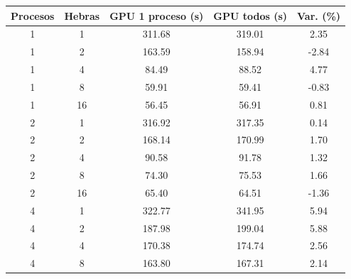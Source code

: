 \begin{table}[ht]
    \centering
    \scriptsize
    \setlength{\tabcolsep}{2pt}
    \renewcommand{\arraystretch}{1.1}
    \begin{tabular}{|c|c|c|c|c|}
        \hline
        \textbf{Procesos} & \textbf{Hebras} & \textbf{GPU 1 proceso (s)} & \textbf{GPU todos (s)} & \textbf{Var. (\%)} \\
        \hline
        1                 & 1               & 311.68                     & 319.01                 & 2.35               \\
        1                 & 2               & 163.59                     & 158.94                 & -2.84              \\
        1                 & 4               & 84.49                      & 88.52                  & 4.77               \\
        1                 & 8               & 59.91                      & 59.41                  & -0.83              \\
        1                 & 16              & 56.45                      & 56.91                  & 0.81               \\
        2                 & 1               & 316.92                     & 317.35                 & 0.14               \\
        2                 & 2               & 168.14                     & 170.99                 & 1.70               \\
        2                 & 4               & 90.58                      & 91.78                  & 1.32               \\
        2                 & 8               & 74.30                      & 75.53                  & 1.66               \\
        2                 & 16              & 65.40                      & 64.51                  & -1.36              \\
        4                 & 1               & 322.77                     & 341.95                 & 5.94               \\
        4                 & 2               & 187.98                     & 199.04                 & 5.88               \\
        4                 & 4               & 170.38                     & 174.74                 & 2.56               \\
        4                 & 8               & 163.80                     & 167.31                 & 2.14               \\

\end{tabular}
\end{table}

